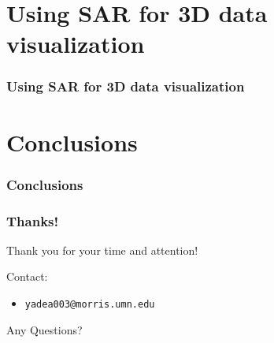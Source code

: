 \documentclass{beamer}
\newcommand{\linespace}{\vskip 0.25cm}
\begin{document}

\section[Using SAR for 3D data visualization]{Using SAR for 3D data visualization}
\begin{frame}
\frametitle{Using SAR for 3D data visualization}
\end{frame}


\section[Conclusions]{Conclusions}
\begin{frame}
\frametitle{Conclusions}
\end{frame}

\begin{frame}
	\frametitle{Thanks!}
	
	Thank you for your time and attention!
		
	\linespace
	\linespace
	
	Contact:  
	\begin{itemize}
		\item \texttt{yadea003@morris.umn.edu}
	\end{itemize}
	
	\linespace
	\linespace
	
	\begin{center}
	{\huge Any Questions?}
	\end{center}
\end{frame}
\end{document}
